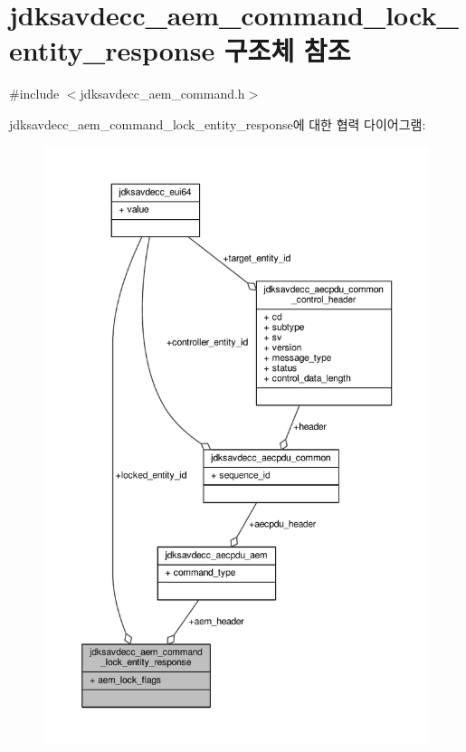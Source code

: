 \hypertarget{structjdksavdecc__aem__command__lock__entity__response}{}\section{jdksavdecc\+\_\+aem\+\_\+command\+\_\+lock\+\_\+entity\+\_\+response 구조체 참조}
\label{structjdksavdecc__aem__command__lock__entity__response}


{\ttfamily \#include $<$jdksavdecc\+\_\+aem\+\_\+command.\+h$>$}



jdksavdecc\+\_\+aem\+\_\+command\+\_\+lock\+\_\+entity\+\_\+response에 대한 협력 다이어그램\+:
\nopagebreak
\begin{figure}[H]
\begin{center}
\leavevmode
\includegraphics[width=350pt]{structjdksavdecc__aem__command__lock__entity__response__coll__graph}
\end{center}
\end{figure}
